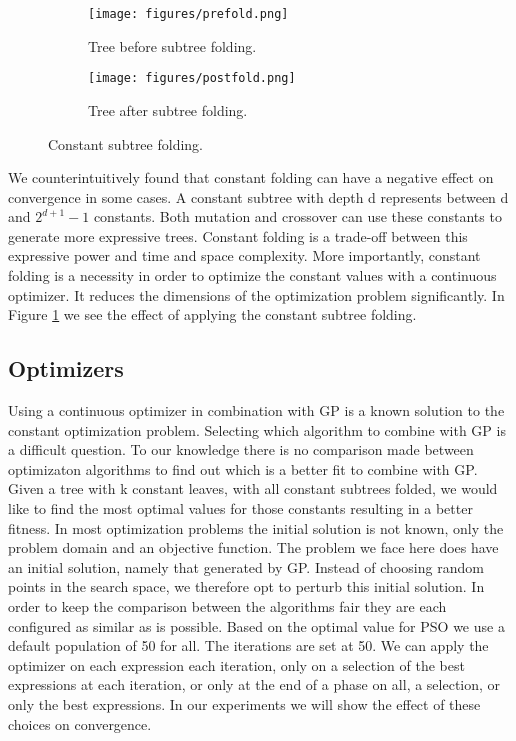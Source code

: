 \begin{figure}
	\centering
    \begin{subfigure}{0.5\textwidth}
    \centering
    \texttt{[image: figures/prefold.png]}
    \caption{Tree before subtree folding.}
	\end{subfigure}
	\begin{subfigure}{0.5\textwidth}
    \centering
    \texttt{[image: figures/postfold.png]}
    \caption{Tree after subtree folding.}
	\end{subfigure}
	    \caption{Constant subtree folding.}
    \label{fig:folding}
\end{figure}
We counterintuitively found that constant folding can have a negative effect on convergence in some cases. A constant subtree with depth d represents between d and $2^{d+1}-1$ constants. Both mutation and crossover can use these constants to generate more expressive trees. Constant folding is a trade-off between this expressive power and time and space complexity. More importantly, constant folding is a necessity in order to optimize the constant values with a continuous optimizer. It reduces the dimensions of the optimization problem significantly. In Figure \ref{fig:folding} we see the effect of applying the constant subtree folding. 
\subsection{Optimizers}
Using a continuous optimizer in combination with GP is a known solution \cite{GEDE, GPConst} to the constant optimization problem.
Selecting which algorithm to combine with GP is a difficult question. To our knowledge there is no comparison made between optimizaton algorithms to find out which is a better fit to combine with GP. Given a tree with k constant leaves, with all constant subtrees folded, we would like to find the most optimal values for those constants resulting in a better fitness. In most optimization problems the initial solution is not known, only the problem domain and an objective function. The problem we face here does have an initial solution, namely that generated by GP. Instead of choosing random points in the search space, we therefore opt to perturb this initial solution. In order to keep the comparison between the algorithms fair they are each configured as similar as is possible. Based on the optimal value for PSO \cite{PSO} we use a default population of 50 for all. The iterations are set at 50. We can apply the optimizer on each expression each iteration, only on a selection of the best expressions at each iteration, or only at the end of a phase on all, a selection, or only the best expressions. In our experiments we will show the effect of these choices on convergence.
